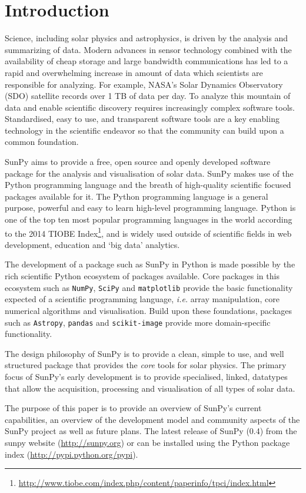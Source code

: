 \section{Introduction}
Science, including solar physics and astrophysics, is driven by the analysis 
and summarizing of data. Modern advances in sensor technology combined with 
the availability of cheap storage and large bandwidth communications has led to 
a rapid and overwhelming increase in amount of data which scientists are responsible
for analyzing. For example, NASA's Solar 
Dynamics Observatory (SDO) satellite records over 1 TB of data per day. To analyze this 
mountain of data and enable scientific discovery requires increasingly complex software 
tools. Standardised, easy to use,
and transparent software tools are a key enabling technology in the scientific endeavor
so that the community can build upon a common foundation.

SunPy aims to provide a free, open source and openly developed software package 
for the analysis and visualisation of solar data. SunPy makes use of the Python 
programming language and the breath of high-quality scientific focused packages 
available for it. The Python programming language is a general purpose, 
powerful and easy to learn high-level programming language. Python is one of 
the top ten most popular programming languages in the world according to the 
2014 TIOBE Index\footnote{\url{http://www.tiobe.com/index.php/content/paperinfo/tpci/index.html}},
and is widely used outside of scientific fields in web development, education 
and `big data' analytics.

The development of a package such as SunPy in Python is made possible by the 
rich scientific Python ecosystem of packages available. Core packages in this 
ecosystem such as \texttt{NumPy}, \texttt{SciPy} and \texttt{matplotlib} 
provide the basic functionality expected of a scientific programming language, 
\textit{i.e.} array manipulation, core numerical algorithms and visualisation. 
Build upon these foundations, packages such as \texttt{Astropy}, \texttt{pandas} and 
\texttt{scikit-image} provide more domain-specific functionality.

The design philosophy of SunPy is to provide a clean, simple to use, and well 
structured package that provides the \textit{core} tools for solar physics. The 
primary focus of SunPy's early development is to provide specialised, linked, 
datatypes that allow the acquisition, processing and visualisation of all types 
of solar data.

The purpose of this paper is to provide an overview of SunPy's current 
capabilities, an overview of the development model and community aspects of the 
SunPy project as well as future plans. The latest release of SunPy (0.4) from
the sunpy website (\url{http://sunpy.org}) or can be installed using 
the Python package index (\mbox{\url{http://pypi.python.org/pypi}}).
